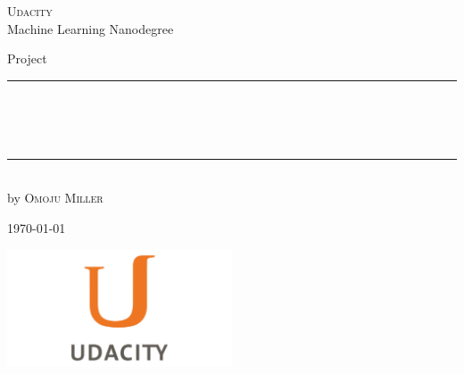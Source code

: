 
\begin{titlepage}
    \begin{addmargin}[-1cm]{-3cm}
    \begin{center}
        \large
        {\Large \textsc{Udacity}}\\[1ex]
        Machine Learning Nanodegree\\
       

        \vfill

        Project\\ \vskip1cm
        \rule{14cm}{0.4pt}\\ \bigskip
        \begingroup
            \Large
            \color{Maroon}\spacedallcaps{\myTitle} \\ \bigskip
        \endgroup
        \spacedlowsmallcaps{\mySubtitle} \\ \bigskip
        \rule{14cm}{0.4pt}\\ \vskip1cm
        by \textsc{Omoju Miller}

        \vfill
        \vfill
        \vfill

       
        \hfill \today
    \end{center}
    \vspace{-3.5cm}
    \includegraphics[width=0.50\textwidth]{figures/udacity_logo}
  \end{addmargin}
\end{titlepage}
